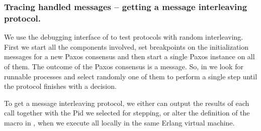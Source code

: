 \subsubsection{Tracing handled messages -- getting a message  interleaving protocol.}

We use the debugging interface of  to test
protocols with random interleaving. First we start all the components
involved, set breakpoints on the initialization messages for a new Paxos
consensus and then start a single Paxos instance on all of them. The outcome
of the Paxos consensus is a  message. So, in
 we look for runnable processes
and select randomly one of them to perform a single step until the protocol
finishes with a decision.


To get a message interleaving protocol, we either can output the results
of each  call together with the
Pid we selected for stepping, or alter the definition of the macro
 in , when we execute all
 locally in the same Erlang virtual machine.





